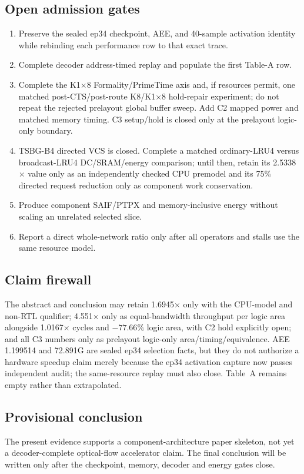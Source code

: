 \documentclass[9pt,twocolumn]{article}
\begin{document}
\subsection{Open admission gates}
\begin{enumerate}
  \item Preserve the sealed ep34 checkpoint, AEE, and 40-sample activation identity
        while rebinding each performance row to that exact trace.
  \item Complete decoder address-timed replay and populate the first Table-A row.
  \item Complete the K1$\times$8 Formality/PrimeTime axis and, if resources permit,
        one matched post-CTS/post-route K8/K1$\times$8 hold-repair experiment;
        do not repeat the rejected prelayout global buffer sweep.  Add C2 mapped
        power and matched memory timing.  C3 setup/hold is closed only at the
        prelayout logic-only boundary.
  \item TSBG-B4 directed VCS is closed.  Complete a matched ordinary-LRU4 versus
        broadcast-LRU4 DC/SRAM/energy comparison; until then, retain its
        2.5338$\times$ value only as an independently checked CPU premodel and
        its 75\% directed request reduction only as component work conservation.
  \item Produce component SAIF/PTPX and memory-inclusive energy without scaling an
        unrelated selected slice.
  \item Report a direct whole-network ratio only after all operators and stalls use
        the same resource model.
\end{enumerate}

\subsection{Claim firewall}
The abstract and conclusion may retain 1.6945$\times$ only with the CPU-model and
non-RTL qualifier; 4.551$\times$ only as equal-bandwidth throughput per logic area
alongside 1.0167$\times$ cycles and $-77.66\%$ logic area, with C2 hold explicitly
open; and all C3 numbers only
as prelayout logic-only area/timing/equivalence.  AEE 1.199514 and 72.891G are sealed ep34 selection facts, but they
do not authorize a hardware speedup claim merely because the ep34 activation
capture now passes independent audit; the same-resource replay must also close.
Table~A remains empty rather than extrapolated.

\subsection{Provisional conclusion}
The present evidence supports a component-architecture paper skeleton, not yet a
decoder-complete optical-flow accelerator claim.  The final conclusion will be
written only after the checkpoint, memory, decoder and energy gates close.
\end{document}
